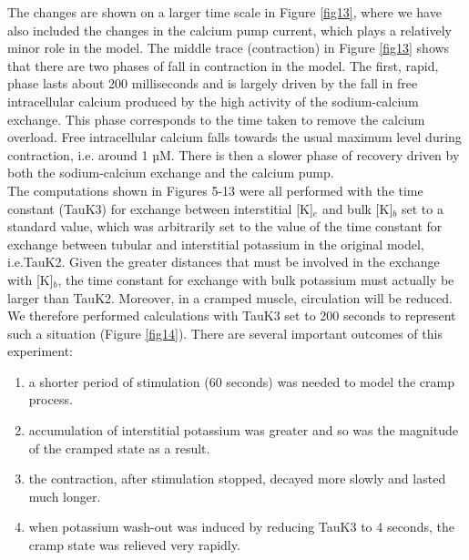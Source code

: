 \documentclass[fleqn,10pt]{physiome}
\begin{document}
The changes are shown on a larger time scale in Figure \ref{fig13}, where we have also included the changes in the calcium pump current, which plays a relatively minor role in the model. The middle trace (contraction) in Figure \ref{fig13} shows that there are two phases of fall in contraction in the model. The first, rapid, phase lasts about 200 milliseconds and is largely driven by the fall in free intracellular calcium produced by the high activity of the sodium-calcium exchange. This phase corresponds to the time taken to remove the calcium overload. Free intracellular calcium falls towards the usual maximum level during contraction, i.e. around 1 µM.  There is then a slower phase of recovery driven by both the sodium-calcium exchange and the calcium pump.\\\newline
The computations shown in Figures 5-13 were all performed with the time constant (TauK3) for exchange between interstitial [K]$_e$ and bulk [K]$_b$ set to a standard value, which was arbitrarily set to the value of the time constant for exchange between tubular and interstitial potassium in the original \citep{shorten2007mathematical} model, i.e.TauK2. Given the greater distances that must be involved in the exchange with [K]$_b$, the time constant for exchange with bulk potassium must actually be larger than TauK2. Moreover, in a cramped muscle, circulation will be reduced. We therefore performed calculations with TauK3 set to 200 seconds to represent such a situation (Figure \ref{fig14}). There are several important outcomes of this experiment:
\renewcommand{\labelenumi}{(\alph{enumi})}
\begin{enumerate}
     \item a shorter period of stimulation (60 seconds) was needed to model the cramp process.
     \item accumulation of interstitial potassium was greater and so was the magnitude of the cramped state as a result.
     \item the contraction, after stimulation stopped, decayed more slowly and lasted much longer.
     \item when potassium wash-out was induced by reducing TauK3 to 4 seconds, the cramp state was relieved very rapidly. 
\end{enumerate}\newline
\end{document}
